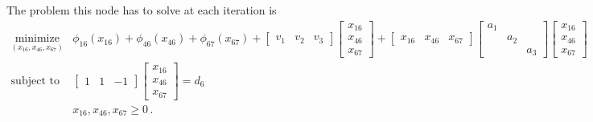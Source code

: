 \documentclass[letter,10pt]{article}
\theoremstyle{definition}
\theoremstyle{nonumberplain}
\begin{document}
		The problem this node has to solve at each iteration is
		\begin{equation}\label{Eq:20SetNetFlowEachNode}
			\begin{array}{ll}
				\underset{(x_{16},x_{46},x_{67})}{\text{minimize}} & \phi_{16}(x_{16}) + \phi_{46}(x_{46}) + \phi_{67}(x_{67})
							+
							\begin{bmatrix}
								v_1 & v_2 & v_3
							\end{bmatrix}
							\begin{bmatrix}
								x_{16} \\
								x_{46} \\
								x_{67}
							\end{bmatrix}
							+
							\begin{bmatrix}
								x_{16} &
								x_{46} &
								x_{67}
							\end{bmatrix}
							\begin{bmatrix}
								a_1 & & \\
								& a_2 & \\
								& & a_3
							\end{bmatrix}
							\begin{bmatrix}
								x_{16} \\
								x_{46} \\
								x_{67}
							\end{bmatrix}
					\\
			\text{subject to} & \begin{bmatrix}
														1 & 1 & -1
			                    \end{bmatrix}
			                    \begin{bmatrix}
														x_{16} \\
														x_{46} \\
														x_{67}
													\end{bmatrix}
													= d_6
													\\
													& x_{16}, x_{46}, x_{67} \geq 0\,.
			\end{array}
		\end{equation}
\end{document}
